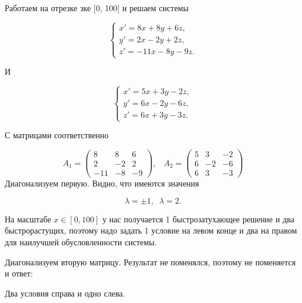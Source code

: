 \documentclass[a4paper]{article}
\begin{document}
\begin{sol}
Работаем на отрезке зке [0, 100] и решаем системы

$$
\begin{cases}
x' =  8x + 8y + 6z,\\
y' = 2x -2y + 2z,\\
z' = -11x - 8y - 9z.
\end{cases}
$$

И 

$$
\begin{cases}
x' = 5x + 3y - 2z,\\
y' = 6x - 2y - 6z,\\
z' = 6x + 3y- 3z.
\end{cases}
$$

С матрицами соответственно

$$
A_1 = \begin{pmatrix}
8 & 8 & 6\\
2 & -2 & 2\\
-11 & -8 & -9
\end{pmatrix},\;\;\; A_2 = \begin{pmatrix}
5 & 3 & -2\\
6 & -2 & -6\\
6 & 3 & -3
\end{pmatrix}
$$
Диагонализуем первую. Видно, что имеются значения 

$$
\lambda = \pm 1,\;\; \lambda = 2.
$$

На масштабе $x\in [0, 100]$ у нас получается 1 быстрозатухающее решение и два быстрорастущих, поэтому надо задать 1 условие на левом конце и два на правом для наилучшей обусловленности системы.

Диагонализуем вторую матрицу.
Результат не поменялся, поэтому не поменяется и ответ:

Два условия справа и одно слева.
\end{sol}
\begin{hiProb}[8.5]
\end{hiProb}
\end{document}
